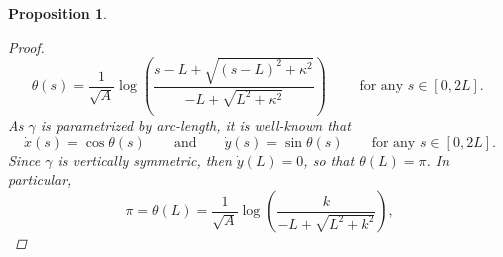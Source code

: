 \documentclass[11pt]{amsart}
\newcommand{\rr}{{\mathbb{R}}}
\renewcommand{\k}{\kappa}
\newcommand{\ga}{\gamma}
\newtheorem{proposition}[theorem]{Proposition}
\theoremstyle{definition}
\theoremstyle{remark}
\numberwithin{equation}{section}
\begin{document}
\begin{proposition}
\begin{proof}
			\begin{equation*}
				\theta(s)=\frac{1}{\sqrt{A}}\log\left(\frac{s-L+\sqrt{(s-L)^2+\k^2}}{-L+\sqrt{L^2+\k^2}}\right)\qquad\text{  for any $s\in[0,2L]$. }
			\end{equation*}
			As $\gamma$ is parametrized by arc-length, it is well-known that 
			\begin{equation}\label{itiswellknownthat}
				\dot x(s)=\cos\theta(s)\qquad\text{and}\qquad\dot y(s)=\sin\theta(s)\qquad\text{for any $s\in[0,2L]$.}
			\end{equation}
			Since $\gamma$ is vertically symmetric, then $\dot y(L)=0$, so that $\theta(L)=\pi$.
			In particular, 
			\begin{equation*}
				\pi=\theta(L)=\frac{1}{\sqrt{A}}\log\left(\frac{k}{-L+\sqrt{L^2+k^2}}\right),
			\end{equation*}

\end{proof}
\end{proposition}
\end{document}
